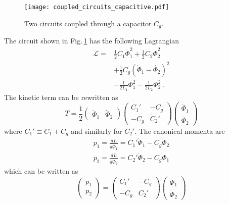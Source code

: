 

\begin{figure}
\begin{centering}
\texttt{[image: coupled\_circuits\_capacitive.pdf]}
\par\end{centering}
\caption{Two circuits coupled through a capacitor $C_g$.}
\label{Fig:coupledCircuits_capacitive}
\end{figure}

The circuit shown in Fig.\,\ref{Fig:coupledCircuits_capacitive} has the following Lagrangian \begin{align}
\mathcal{L} = & \frac{1}{2}C_1\dot{\Phi}_1^2 + \frac{1}{2}C_2\dot{\Phi}_2^2 \nonumber \\
& + \frac{1}{2}C_g \left( \dot{\Phi}_1 - \dot{\Phi_2} \right)^2 \nonumber \\
& - \frac{1}{2L_1}\Phi_1^2 - \frac{1}{2L_2}\Phi_2^2 \, . \end{align}
The kinetic term can be rewritten as \begin{equation}
T = \frac{1}{2}
\left( \begin{array}{cc} \dot{\Phi}_1 & \dot{\Phi}_2 \end{array} \right)
\left( \begin{array}{cc} C_1' & -C_g \\ -C_g & C_2' \end{array} \right)
\left( \begin{array}{c} \dot{\Phi}_1 \\ \dot{\Phi}_2 \end{array} \right) \label{eq:kineticInFlux} \end{equation}
where $C_1' \equiv C_1+C_g$ and similarly for $C_2'$. The canonical momenta are \begin{eqnarray}
p_1 = \frac{dL}{d\dot{\Phi}_1} = C_1'\dot{\Phi}_1 - C_g\dot{\Phi}_2 \nonumber \\
p_2 = \frac{dL}{d\dot{\Phi}_2} = C_2'\dot{\Phi}_2 - C_g\dot{\Phi}_1 \end{eqnarray}
which can be written as \begin{equation}
\left( \begin{array}{c} p_1 \\ p_2 \end{array} \right) =
\left( \begin{array}{cc} C_1' & -C_g \\ -C_g & C_2' \end{array} \right)
\left( \begin{array}{c} \dot{\Phi}_1 \\ \dot{\Phi}_2 \end{array} \right) \end{equation}
